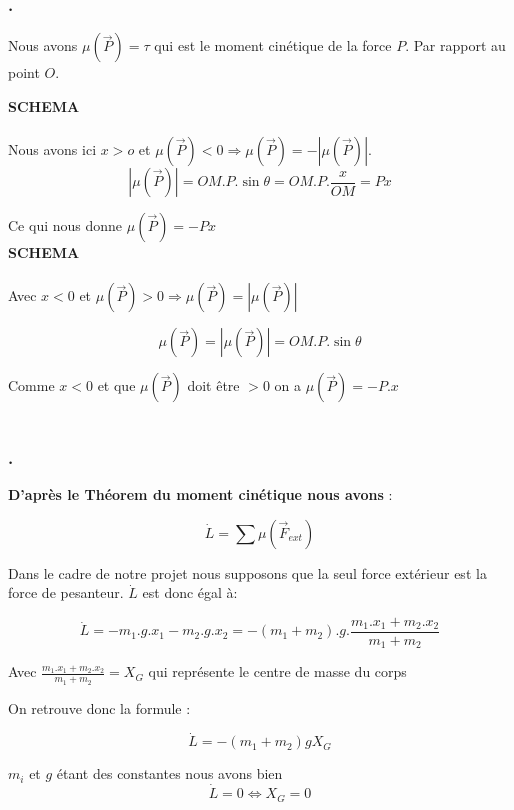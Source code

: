 \documentclass[a4paper,12pt]{report}
\begin{document}
\subsubsection{.}
\label{subs:}

Nous avons $\mu(\overrightarrow{P}) = \tau$ qui est le moment cinétique de la force $P$. Par rapport au point $O$.

\textbf{SCHEMA}\\\\
Nous avons ici $x > o$ et $\mu(\overrightarrow{P}) < 0 \Rightarrow \mu(\overrightarrow{P}) = - |\mu(\overrightarrow{P})|$.\\
$$
|\mu(\overrightarrow{P})| = OM.P.\sin{\theta} = OM.P. \frac{x}{OM} = Px
$$

Ce qui nous donne $\mu(\overrightarrow{P}) = -Px$\\

\textbf{SCHEMA}\\\\
Avec $x < 0$ et $\mu(\overrightarrow{P}) > 0 \Rightarrow \mu(\overrightarrow{P}) = |\mu(\overrightarrow{P})|$

$$
\mu(\overrightarrow{P}) = |\mu(\overrightarrow{P})| = OM.P.\sin{\theta}
$$

Comme $x < 0$ et que $\mu(\overrightarrow{P})$ doit être $> 0$ on a $\mu(\overrightarrow{P}) = -P.x$\\\\



\subsubsection{.}
\label{subs:}
\textbf{D'après le Théorem du moment cinétique nous avons} :

$$\dot{L} = \sum{}{\mu(\overrightarrow{F}_{ext})} $$

Dans le cadre de notre  projet nous supposons que la seul force extérieur est la force de pesanteur.
$\dot{L}$ est donc égal à:

$$\dot{L} = -m_1.g.x_1 - m_2.g.x_2 = - (m_1 + m_2).g.\frac{m_1.x_1 + m_2.x_2}{m_1 + m_2}$$

Avec $\frac{m_1.x_1 + m_2.x_2}{m_1 + m_2} = X_G$ qui représente le centre de masse du corps

On retrouve donc la formule :

$$\dot{L} = - (m_1 + m_2)g X_G$$

$m_i$ et $g$ étant des constantes nous avons bien
$$\dot{L} = 0 \Leftrightarrow X_G = 0$$
\end{document}
